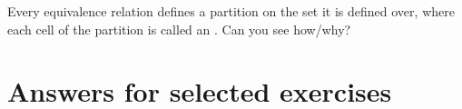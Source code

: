 \documentclass[11pt]{article}
\begin{document}
\begin{uexercise}\label{ex-equi}
Every equivalence relation defines a partition on the set it is
defined over, where each cell of the partition is called an . Can you see how/why?
\end{uexercise}


% 

\newpage
\appendix
\section{Answers for selected exercises}
\end{document}

